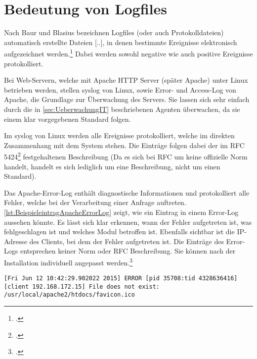 
\section{Bedeutung von Logfiles}\label{sec:BedeutungVonLogfiles}
Nach Baur und Blasius bezeichnen Logfiles (oder auch Protokolldateien) \flqq [...] automatisch erstellte Dateien [..], in denen bestimmte Ereignisse elektronisch aufgezeichnet werden.\frqq\footcite[S. 847]{Baur.2014} Dabei werden sowohl negative wie auch positive Ereignisse protokolliert.

Bei Web-Servern, welche mit Apache \acs{HTTP} Server (später Apache) unter Linux betrieben werden, stellen syslog von Linux, sowie Error- und Access-Log von Apache, die Grundlage zur Überwachung des Servers. Sie lassen sich sehr einfach durch die in \autoref{sec:UeberwachungIT} beschriebenen Agenten überwachen, da sie einem klar vorgegebenen Standard folgen.

Im syslog von Linux werden alle Ereignisse protokolliert, welche im direkten Zusammenhang mit dem System stehen. Die Einträge folgen dabei der im \ac{RFC} 5424\footcite[RFC 5424,][]{RFC5424.2009} festgehaltenen Beschreibung (Da es sich bei RFC um keine offizielle Norm handelt, handelt es sich lediglich um eine Beschreibung, nicht um einen Standard).

Das Apache-Error-Log enthält diagnostische Informationen und protokolliert alle Fehler, welche bei der Verarbeitung einer Anfrage auftreten. \autoref{lst:BeispieleintragApacheErrorLog} zeigt, wie ein Eintrag in einem Error-Log aussehen könnte. Es lässt sich klar erkennen, wann der Fehler aufgetreten ist, was fehlgeschlagen ist und welches Modul betroffen ist. Ebenfalls sichtbar ist die \ac{IP}-Adresse des Clients, bei dem der Fehler aufgetreten ist. Die Einträge des Error-Logs entsprechen keiner Norm oder \ac{RFC} Beschreibung. Sie können nach der Installation individuell angepasst werden.\footcite[Vgl.][]{ApacheErrorLog.2015} \\

\begin{lstlisting}[caption=Beispieleintrag für ein Apache-Error-Log,label=lst:BeispieleintragApacheErrorLog]
[Fri Jun 12 10:42:29.902022 2015] ERROR [pid 35708:tid 4328636416] [client 192.168.172.15] File does not exist: /usr/local/apache2/htdocs/favicon.ico
\end{lstlisting}

